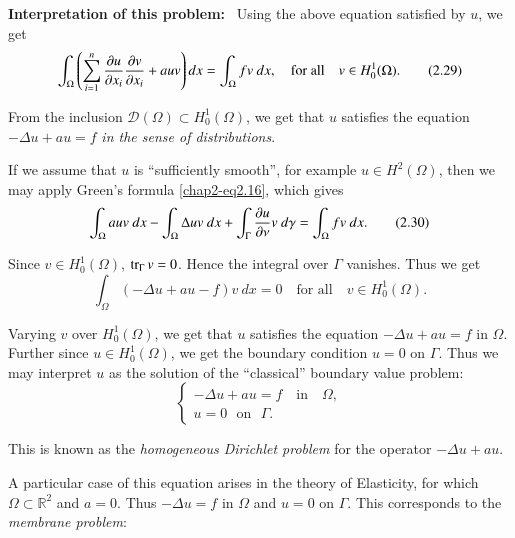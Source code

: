 \noindent
{\bf Interpretation of this problem:}~ Using the above equation
satisfied by $u$, we get
\begin{equation*}
\int_{\Omega}\left(\sum^{n}_{i=1}\frac{\partial u}{\partial x_{i}}\frac{\partial v}{\partial
  x_{i}}+auv\right)dx=\int_{\Omega}fv\ dx,\quad\text{for all}\quad
v\in H^{1}_{0}(\Omega).\tag{2.29}\label{chap2-eq2.29} 
\end{equation*}

From the inclusion $\mathscr{D}(\Omega)\subset H^{1}_{0}(\Omega)$, we
get that $u$ satisfies the equation $-\Delta u+au=f$ {\em in the sense
  of distributions}.

If we assume that $u$ is ``sufficiently smooth'', for example $u\in
H^{2}(\Omega)$, then we may apply Green's formula
\eqref{chap2-eq2.16}, which gives
\begin{equation*}
\int_{\Omega}auv\ dx-\int_{\Omega}\Delta uv\ dx+\int_{\Gamma}\frac{\p
  u}{\p
  \nu}v\ d\gamma=\int_{\Omega}fv\ dx.\tag{2.30}\label{chap2-eq2.30} 
\end{equation*}

Since $v\in H^{1}_{0}(\Omega)$, $\operatorname{tr}_{\Gamma}v=0$. Hence the integral
over $\Gamma$ vanishes. Thus we get
\begin{equation*}
\int_{\Omega}(-\Delta u+au-f)v\ dx=0\quad\text{for all}\quad v\in
H^{1}_{0}(\Omega).\tag{2.31}\label{chap2-eq2.31} 
\end{equation*}

Varying $v$ over $H^{1}_{0}(\Omega)$, we get that $u$ satisfies the
equation $-\Delta u+au=f$ in $\Omega$. Further since $u\in
H^{1}_{0}(\Omega)$, we get the boundary condition $u=0$ on
$\Gamma$. Thus we may interpret $u$ as the solution of the
``classical'' boundary value problem:
\begin{equation*}
\begin{cases}
-\Delta u+au =f \quad\text{in}\quad \Omega,\\
u=0\text{~ on~ } \Gamma.
\end{cases}\tag{2.32}\label{chap2-eq2.32}
\end{equation*}\pageoriginale

This is known as the {\em homogeneous Dirichlet problem} for the
operator $-\Delta u+au$.

A particular case of this equation arises in the theory of Elasticity,
for which $\Omega\subset \mathbb{R}^{2}$ and $a=0$. Thus $-\Delta u=f$
in $\Omega$ and $u=0$ on $\Gamma$. This corresponds to the {\em
  membrane problem}:

